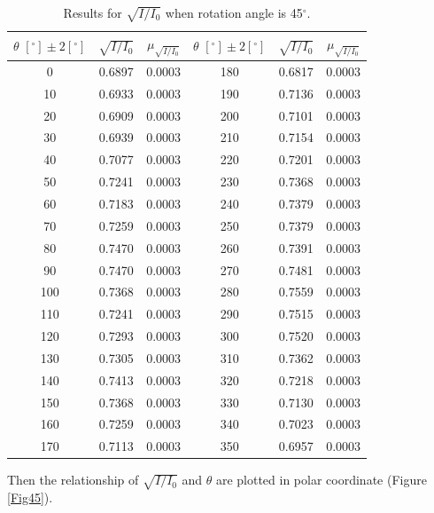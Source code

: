 \documentclass{article}
\begin{document}
\begin{table}[H]\centering
\begin{tabular}{ccc||ccc}
\toprule
$\theta\,\,[^\circ] \pm 2[^\circ]$ & $\sqrt{I/I_0}$ & $\mu_{\sqrt{I/I_0}}$ & $\theta\,\,[^\circ] \pm 2[^\circ]$ & $\sqrt{I/I_0}$ & $\mu_{\sqrt{I/I_0}}$ \\
\midrule
0 & 0.6897 & 0.0003 & 180 & 0.6817 & 0.0003 \\
10 & 0.6933 & 0.0003 & 190 & 0.7136 & 0.0003 \\
20 & 0.6909 & 0.0003 & 200 & 0.7101 & 0.0003 \\
30 & 0.6939 & 0.0003 & 210 & 0.7154 & 0.0003 \\
40 & 0.7077 & 0.0003 & 220 & 0.7201 & 0.0003 \\
50 & 0.7241 & 0.0003 & 230 & 0.7368 & 0.0003 \\
60 & 0.7183 & 0.0003 & 240 & 0.7379 & 0.0003 \\
70 & 0.7259 & 0.0003 & 250 & 0.7379 & 0.0003 \\
80 & 0.7470 & 0.0003 & 260 & 0.7391 & 0.0003 \\
90 & 0.7470 & 0.0003 & 270 & 0.7481 & 0.0003 \\
100 & 0.7368 & 0.0003 & 280 & 0.7559 & 0.0003 \\
110 & 0.7241 & 0.0003 & 290 & 0.7515 & 0.0003 \\
120 & 0.7293 & 0.0003 & 300 & 0.7520 & 0.0003 \\
130 & 0.7305 & 0.0003 & 310 & 0.7362 & 0.0003 \\
140 & 0.7413 & 0.0003 & 320 & 0.7218 & 0.0003 \\
150 & 0.7368 & 0.0003 & 330 & 0.7130 & 0.0003 \\
160 & 0.7259 & 0.0003 & 340 & 0.7023 & 0.0003 \\
170 & 0.7113 & 0.0003 & 350 & 0.6957 & 0.0003\\
\bottomrule
\end{tabular}
\caption{Results for $\sqrt{I/I_0}$ when rotation angle is 45$^\circ$.}\label{TableSqrt45}
\end{table}

Then the relationship of $\sqrt{I/I_0}$ and $\theta$ are plotted in polar coordinate (Figure \ref{Fig45}).
\end{document}

